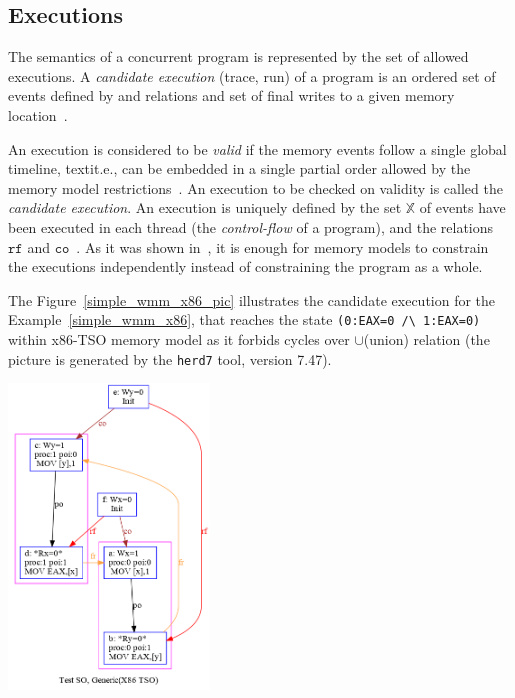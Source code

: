 \subsection{Executions}
\label{ch:wmm:model:executions}

The semantics of a concurrent program is represented by the set of allowed executions.
A \textit{candidate execution} (trace, run) of a program is an ordered set of events defined by \po and \rf relations and set of final writes to a given memory location~\cite{alglave2014herding}.

An execution is considered to be \textit{valid} if the memory events follow a single global timeline, textit.e., can be embedded in a single partial order allowed by the memory model restrictions~\cite{alglave2010shared}. 
An execution to be checked on validity is called the \textit{candidate execution}.
An execution is uniquely defined by the set $\mathbb{X}$ of events have been executed in each thread (the \textit{control-flow} of a program), and the relations $\mathtt{rf}$ and $\mathtt{co}$~\cite{alglave2010shared}.
As it was shown in~\cite{wickerson2017automatically}, it is enough for memory models to constrain the executions independently instead of constraining the program as a whole.

The Figure~\ref{simple_wmm_x86_pic} illustrates the candidate execution for the Example~\ref{simple_wmm_x86}, that reaches the state \texttt{(0:EAX=0~/\textbackslash~1:EAX=0)} within x86-TSO memory model as it forbids cycles over \po$\cup$\rf (union) relation (the picture is generated by the \texttt{herd7} tool, version 7.47). 

\includegraphics[width=0.4\textwidth]{img/my/simple_wmm_x86.png}
\label{simple_wmm_x86_pic}



